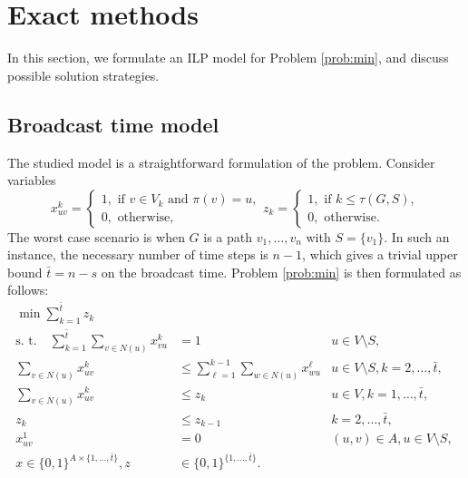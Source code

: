 \section{Exact methods} \label{sec:exact}


In this section, we formulate an ILP model for Problem \ref{prob:min}, and discuss possible solution strategies. 

\subsection{Broadcast time model}
The studied model is a straightforward formulation of the problem.
Consider variables 
$$ x_{uv}^k=
\begin{cases} 
1, \text{ if } v\in V_k \text{ and } \pi(v)=u,\\ 
0, \text{ otherwise},
\end{cases}
z_{k}=\begin{cases}
1, \text{ if } k\leq\tau(G,S),\\
0, \text{ otherwise}.
\end{cases}
$$
The worst case scenario is when $G$ is a path $v_1,\dots,v_n$ with $S=\{v_1\}$. 
In such an instance, the necessary number of time steps is $n-1$, which gives a trivial upper bound $\bar{t}=n-s$ on the broadcast time.
Problem \ref{prob:min} is then formulated as follows: 
\begin{subequations}\label{mod:basic}
\begin{align}
\label{mod:basic:obj} \min \sum\limits_{k=1}^{\bar{t}}z_k \\ 
\text{s. t.~~~} \label{mod:basic:singlein} \sum\limits_{k=1}^{\bar{t}}\sum\limits_{v\in N(u)}x_{vu}^k & = 1 & u\in V \setminus S,\\
\label{mod:basic:tIncreases} \sum\limits_{v\in N(u)}x_{uv}^k &\leq\sum\limits_{\ell=1}^{k-1}\sum\limits_{w\in N(u)} x_{wu}^{\ell}  & u\in V\setminus S, k=2,\dots,\bar{t},\\
\label{mod:basic:tcrel} \sum\limits_{v\in N(u)}x_{uv}^k & \leq z_k &  u\in V,k=1,\dots,\bar{t},\\
\label{mod:basic:timing} z_k & \leq z_{k-1} &  k=2,\dots,\bar{t},\\
\label{mod:basic:positiveCost}x_{uv}^1 & = 0 & (u,v)\in A, u \in V\setminus S,\\
\label{mod:basic:dim}x \in \{0,1\}^{A\times \{1,\dots,\bar{t}\}},z&\in\{0,1\}^{\{1,\dots,\bar{t}\}}.&
\end{align}~
\end{subequations}
